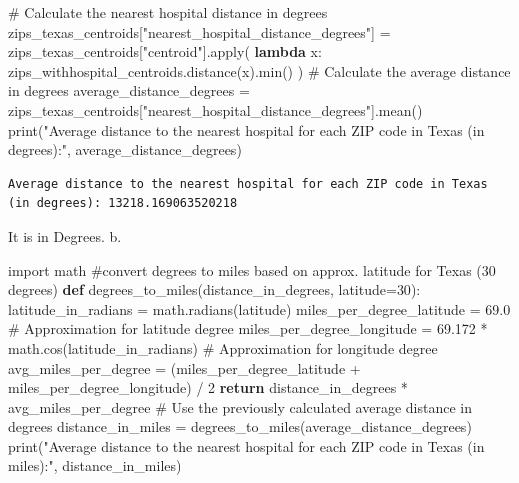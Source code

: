 \documentclass[
  letterpaper,
  DIV=11,
  numbers=noendperiod]{scrartcl}
\newenvironment{Shaded}{\begin{snugshade}}{\end{snugshade}}
\newcommand{\BuiltInTok}[1]{\textcolor[rgb]{0.00,0.23,0.31}{#1}}
\newcommand{\CommentTok}[1]{\textcolor[rgb]{0.37,0.37,0.37}{#1}}
\newcommand{\ControlFlowTok}[1]{\textcolor[rgb]{0.00,0.23,0.31}{\textbf{#1}}}
\newcommand{\DecValTok}[1]{\textcolor[rgb]{0.68,0.00,0.00}{#1}}
\newcommand{\FloatTok}[1]{\textcolor[rgb]{0.68,0.00,0.00}{#1}}
\newcommand{\ImportTok}[1]{\textcolor[rgb]{0.00,0.46,0.62}{#1}}
\newcommand{\KeywordTok}[1]{\textcolor[rgb]{0.00,0.23,0.31}{\textbf{#1}}}
\newcommand{\NormalTok}[1]{\textcolor[rgb]{0.00,0.23,0.31}{#1}}
\newcommand{\OperatorTok}[1]{\textcolor[rgb]{0.37,0.37,0.37}{#1}}
\newcommand{\StringTok}[1]{\textcolor[rgb]{0.13,0.47,0.30}{#1}}
\begin{document}
\begin{Shaded}
\begin{Highlighting}[]
\CommentTok{\# Calculate the nearest hospital distance in degrees}
\NormalTok{zips\_texas\_centroids[}\StringTok{"nearest\_hospital\_distance\_degrees"}\NormalTok{] }\OperatorTok{=}\NormalTok{ zips\_texas\_centroids[}\StringTok{"centroid"}\NormalTok{].}\BuiltInTok{apply}\NormalTok{(}
    \KeywordTok{lambda}\NormalTok{ x: zips\_withhospital\_centroids.distance(x).}\BuiltInTok{min}\NormalTok{()}
\NormalTok{)}
\CommentTok{\# Calculate the average distance in degrees}
\NormalTok{average\_distance\_degrees }\OperatorTok{=}\NormalTok{ zips\_texas\_centroids[}\StringTok{"nearest\_hospital\_distance\_degrees"}\NormalTok{].mean()}
\BuiltInTok{print}\NormalTok{(}\StringTok{"Average distance to the nearest hospital for each ZIP code in Texas (in degrees):"}\NormalTok{, average\_distance\_degrees)}
\end{Highlighting}
\end{Shaded}

\begin{verbatim}
Average distance to the nearest hospital for each ZIP code in Texas (in degrees): 13218.169063520218
\end{verbatim}

It is in Degrees. b.

\begin{Shaded}
\begin{Highlighting}[]
\ImportTok{import}\NormalTok{ math}
\CommentTok{\#convert degrees to miles based on approx. latitude for Texas (30 degrees)}
\KeywordTok{def}\NormalTok{ degrees\_to\_miles(distance\_in\_degrees, latitude}\OperatorTok{=}\DecValTok{30}\NormalTok{):}
\NormalTok{    latitude\_in\_radians }\OperatorTok{=}\NormalTok{ math.radians(latitude)}
\NormalTok{    miles\_per\_degree\_latitude }\OperatorTok{=} \FloatTok{69.0}  \CommentTok{\# Approximation for latitude degree}
\NormalTok{    miles\_per\_degree\_longitude }\OperatorTok{=} \FloatTok{69.172} \OperatorTok{*}\NormalTok{ math.cos(latitude\_in\_radians)  }\CommentTok{\# Approximation for longitude degree}
\NormalTok{    avg\_miles\_per\_degree }\OperatorTok{=}\NormalTok{ (miles\_per\_degree\_latitude }\OperatorTok{+}\NormalTok{ miles\_per\_degree\_longitude) }\OperatorTok{/} \DecValTok{2}
    \ControlFlowTok{return}\NormalTok{ distance\_in\_degrees }\OperatorTok{*}\NormalTok{ avg\_miles\_per\_degree}
\CommentTok{\# Use the previously calculated average distance in degrees}
\NormalTok{distance\_in\_miles }\OperatorTok{=}\NormalTok{ degrees\_to\_miles(average\_distance\_degrees)}
\BuiltInTok{print}\NormalTok{(}\StringTok{"Average distance to the nearest hospital for each ZIP code in Texas (in miles):"}\NormalTok{, distance\_in\_miles)}
\end{Highlighting}
\end{Shaded}
\end{document}

